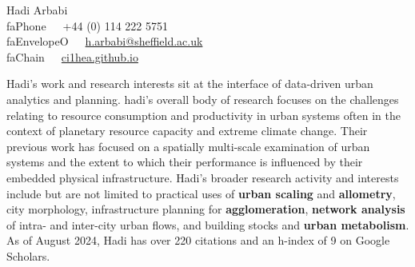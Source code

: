 \documentclass[10pt]{article}
\newcommand{\seticon}[1]{\csname #1\endcsname}
\newcommand{\makeheading}[2][]%
        {\hspace*{-\marginparsep minus \marginparwidth}%
         \begin{minipage}[t]{\textwidth+\marginparwidth+\marginparsep}%
             {\large \bfseries #2 \hfill #1}\\[-0.15\baselineskip]%
                 \rule{\columnwidth}{1pt}%
         \end{minipage}}
\renewcommand{\section}[1]{\pagebreak[3]%
    \vspace{1.3\baselineskip}%
    \phantomsection\addcontentsline{toc}{section}{#1}%
    \noindent\llap{\large\smash{\parbox[t]{\marginparwidth}{\raggedright #1}}}%
    \vspace{-\baselineskip}\par}
\providecommand*\email[1]{\href{mailto:#1}{#1}}
\begin{document}
\vspace*{25mm}
{\Huge Hadi Arbabi}\\[1cm]
\seticon{faPhone}~~~+44 (0) 114 222 5751\\
\seticon{faEnvelopeO}~~~\href{mailto:h.arbabi@sheffield.ac.uk}{h.arbabi@sheffield.ac.uk}\\
\seticon{faChain}~~~\href{https://ci1hea.github.io}{ci1hea.github.io}\\

\section{}
Hadi's work and research interests sit at the interface of data-driven urban analytics and planning. hadi’s overall body of research focuses on the challenges relating to resource consumption and productivity in urban systems often in the context of planetary resource capacity and extreme climate change. Their previous work has focused on a spatially multi-scale examination of urban systems and the extent to which their performance is influenced by their embedded physical infrastructure. Hadi's broader research activity and interests include but are not limited to practical uses of \textbf{urban scaling} and \textbf{allometry}, city morphology, infrastructure planning for \textbf{agglomeration}, \textbf{network analysis} of intra- and inter-city urban flows, and building stocks and \textbf{urban metabolism}. As of August 2024, Hadi has over 220 citations and an h-index of 9 on Google Scholars.\par
\end{document}
